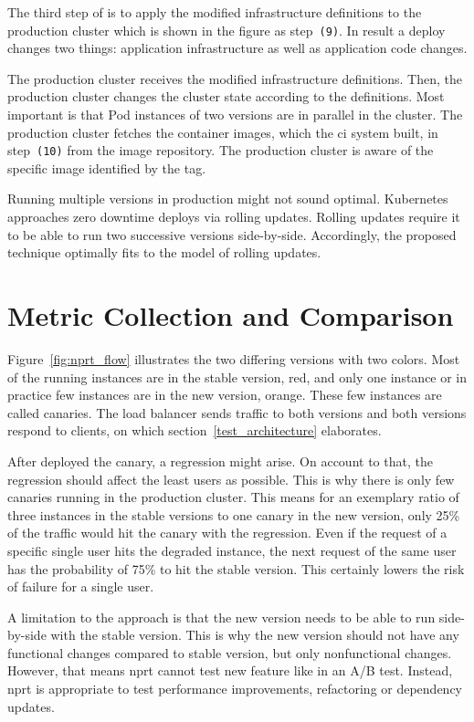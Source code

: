 The third step of \deployer{} is to apply the modified infrastructure definitions to the
production cluster which is shown in the figure as step~\texttt{(9)}. In result a deploy
changes two things: application infrastructure as well as application code changes.

The production cluster receives the modified infrastructure definitions. Then, the production
cluster changes the cluster state according to the definitions. Most important is that Pod
instances of two versions are in parallel in the cluster. The production cluster fetches
the container images, which the \gls{ci} system built, in step~\texttt{(10)} from the image repository. The production cluster is aware of the
specific image identified by the tag.

Running multiple versions in production might not sound optimal. Kubernetes approaches zero downtime
deploys via rolling updates. Rolling updates require it to be able to run two successive versions
side-by-side. Accordingly, the proposed technique optimally fits to the model of rolling updates.

\section{Metric Collection and Comparison}

Figure~\ref{fig:nprt_flow} illustrates the two differing versions with two colors. Most of
the running instances are in the stable version, red, and only one instance or in practice
few instances are in the new version, orange. These few instances are called canaries.
The load balancer sends traffic to both versions and both versions respond to clients, on
which section~\ref{test_architecture} elaborates.

After \deployer{} deployed the canary, a regression might arise. On account to that,
the regression should affect the least users as possible. This is why there is only few
canaries running in the production cluster. This means for an exemplary ratio of three
instances in the stable versions to one canary in the new version, only 25\% of the
traffic would hit the canary with the regression. Even if the request of a specific
single user hits the degraded instance, the next request of the same user has the
probability of 75\% to hit the stable version. This certainly lowers the risk of failure
for a single user.

A limitation to the approach is that the new version needs to be able to run side-by-side with the stable version. This is why the new version should not have any
functional changes compared to stable version, but only nonfunctional changes. However, that
means \gls{nprt} cannot test new feature like in an A/B test. Instead, \gls{nprt} is
appropriate to test performance improvements, refactoring or dependency updates.

